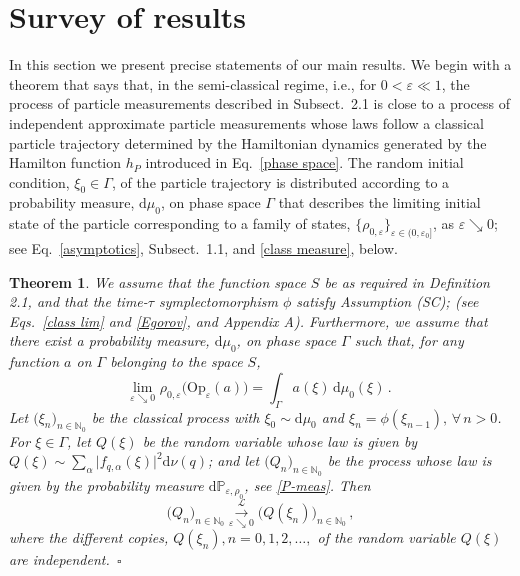 \documentclass[11pt]{article}
\newtheorem{theorem}{Theorem}[section]
\begin{document}
\section{Survey of results}\label{survey}
In this section we present precise statements of our main results. We begin with a theorem 
that says that, in the semi-classical regime, i.e., for $0<\varepsilon \ll 1$, the process of particle measurements 
described in Subsect.~2.1 is close to a process of independent approximate particle measurements whose laws 
follow a classical particle trajectory determined by the Hamiltonian dynamics generated by 
the Hamilton function $h_P$ introduced in Eq.~\eqref{phase space}. 
The random initial condition, $\xi_0 \in \Gamma$, of the particle trajectory is distributed according 
to a probability measure, $\text{d}\mu_0$, on phase space $\Gamma$ that describes the limiting initial 
state of the particle corresponding to a family of states, $\big\{\rho_{0,\varepsilon}\big\}_{\varepsilon\in (0, \varepsilon_0]}$, as $\varepsilon \searrow 0$; see Eq.~\eqref{asymptotics}, 
Subsect.~1.1, and \eqref{class measure}, below.
\begin{theorem} We assume that the function space $S$ be as required in Definition 2.1, and that the
time-$\tau$ symplectomorphism $\phi$ satisfy Assumption (SC); (see Eqs.~\eqref{class lim} and \eqref{Egorov}, 
and Appendix A). Furthermore, we assume that there exist a probability measure, $\text{d}\mu_0$, on phase space $\Gamma$ such that, for any function $a$ on $\Gamma$ belonging to the space 
$S$,
\begin{equation}\label{class measure}
\underset{\varepsilon \searrow 0}{\text{lim}}\,\, \rho_{0, \varepsilon} \big(\text{Op}_{\varepsilon}(a)\big) =
 \int_{\Gamma} a(\xi)\,\text{d}\mu_{0}(\xi)\,.
\end{equation}
Let $\big(\xi_n\big)_{n\in \mathbb{N}_0}$ be the classical process with $\xi_0 \sim \text{d}\mu_0$ and 
$\xi_n= \phi(\xi_{n-1}), \,\forall \,n>0$. For $\xi \in \Gamma$, let $Q(\xi)$ be the random variable whose law is 
given by
$Q(\xi) \sim \sum_{\alpha}\big| f_{q, \alpha}(\xi)\big|^{2} \text{d}\nu(q)$; and let $\big(Q_n\big)_{n\in \mathbb{N}_0}$ 
be the process whose law is given by the probability measure
$\mathrm{d}\mathbb{P}_{\varepsilon, \rho_0}$, see \eqref{P-meas}. Then
$$ \big(Q_n\big)_{n\in \mathbb{N}_0} \overset{\mathcal{L}}{\underset{\varepsilon \searrow 0}{\longrightarrow}} 
\big(Q(\xi_n)\big)_{n \in \mathbb{N}_0}\,,$$
where the different copies, $Q(\xi_{n}), n=0,1,2, \dots,$ of the random variable $Q(\xi)$ are independent.\, $\square$
\end{theorem}
\end{document}
